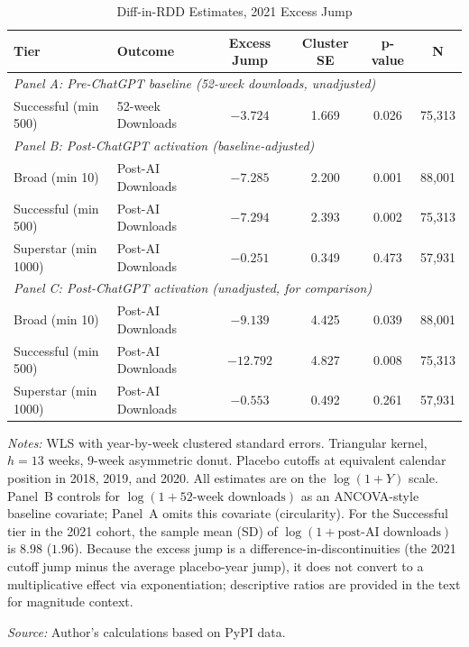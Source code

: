 \documentclass[12pt, a4paper]{report}
\begin{document}
\begin{table}[ht]
\centering
\caption{Diff-in-RDD Estimates, 2021 Excess Jump}\label{tab:diffrdd}
\small
\begin{tabular}{llcccc}
\toprule
\textbf{Tier} & \textbf{Outcome} & \textbf{Excess Jump} & \textbf{Cluster SE} & \textbf{p-value} & \textbf{N} \\ \midrule
\multicolumn{6}{l}{\textit{Panel A: Pre-ChatGPT baseline (52-week downloads, unadjusted)}} \\
Successful (min 500) & 52-week Downloads & $-3.724$ & 1.669 & 0.026 & 75,313 \\[4pt]
\multicolumn{6}{l}{\textit{Panel B: Post-ChatGPT activation (baseline-adjusted)}} \\
Broad (min 10) & Post-AI Downloads & $-7.285$ & 2.200 & 0.001 & 88,001 \\
Successful (min 500) & Post-AI Downloads & $-7.294$ & 2.393 & 0.002 & 75,313 \\
Superstar (min 1000) & Post-AI Downloads & $-0.251$ & 0.349 & 0.473 & 57,931 \\[4pt]
\multicolumn{6}{l}{\textit{Panel C: Post-ChatGPT activation (unadjusted, for comparison)}} \\
Broad (min 10) & Post-AI Downloads & $-9.139$ & 4.425 & 0.039 & 88,001 \\
Successful (min 500) & Post-AI Downloads & $-12.792$ & 4.827 & 0.008 & 75,313 \\
Superstar (min 1000) & Post-AI Downloads & $-0.553$ & 0.492 & 0.261 & 57,931 \\ \bottomrule
\end{tabular}
\begin{tablenotes}
\small
\item \textit{Notes:} WLS with year-by-week clustered standard errors. Triangular kernel, $h = 13$ weeks, 9-week asymmetric donut. Placebo cutoffs at equivalent calendar position in 2018, 2019, and 2020. All estimates are on the $\log(1+Y)$ scale. Panel~B controls for $\log(1 + \text{52-week downloads})$ as an ANCOVA-style baseline covariate; Panel~A omits this covariate (circularity). For the Successful tier in the 2021 cohort, the sample mean (SD) of $\log(1 + \text{post-AI downloads})$ is $8.98$ ($1.96$). Because the excess jump is a difference-in-discontinuities (the 2021 cutoff jump minus the average placebo-year jump), it does not convert to a multiplicative effect via exponentiation; descriptive ratios are provided in the text for magnitude context.
\item \textit{Source:} Author's calculations based on PyPI data.
\end{tablenotes}
\end{table}
\end{document}
